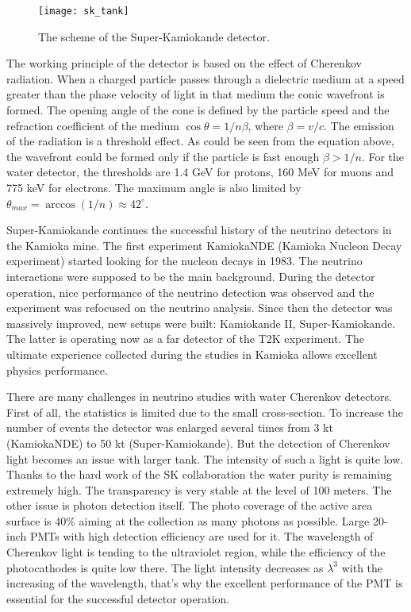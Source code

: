 \documentclass[../main.tex]{subfiles}
\begin{document}
\begin{figure}[!ht]
  \centering
  \texttt{[image: sk\_tank]}
  \caption{The scheme of the Super-Kamiokande detector.}
  \label{fig:t2k:sk}
\end{figure}

The working principle of the detector is based on the effect of Cherenkov radiation. When a charged particle passes through a dielectric medium at a speed greater than the phase velocity of light in that medium the conic wavefront is formed. The opening angle of the cone is defined by the particle speed and the refraction coefficient of the medium $\cos{\theta}=1/n\beta$, where $\beta=v/c$. The emission of the radiation is a threshold effect. As could be seen from the equation above, the wavefront could be formed only if the particle is fast enough $\beta>1/n$. For the water detector, the thresholds are 1.4 GeV for protons, 160 MeV for muons and 775 keV for electrons. The maximum angle is also limited by $\theta_{max}=\arccos(1/n)\approx42^\circ$.

Super-Kamiokande continues the successful history of the neutrino detectors in the Kamioka mine. The first experiment KamiokaNDE (Kamioka Nucleon Decay experiment) started looking for the nucleon decays in 1983. The neutrino interactions were supposed to be the main background. During the detector operation, nice performance of the neutrino detection was observed and the experiment was refocused on the neutrino analysis. Since then the detector was massively improved, new setups were built: Kamiokande II, Super-Kamiokande. The latter is operating now as a far detector of the T2K experiment. The ultimate experience collected during the studies in Kamioka allows excellent physics performance.

There are many challenges in neutrino studies with water Cherenkov detectors. First of all, the statistics is limited due to the small cross-section. To increase the number of events the detector was enlarged several times from 3 kt (KamiokaNDE) to 50 kt (Super-Kamiokande). But the detection of Cherenkov light becomes an issue with larger tank. The intensity of such a light is quite low. Thanks to the hard work of the SK collaboration the water purity is remaining extremely high. The transparency is very stable at the level of 100 meters. The other issue is photon detection itself. The photo coverage of the active area surface is 40\% aiming at the collection as many photons as possible. Large 20-inch PMTs with high detection efficiency are used for it. The wavelength of Cherenkov light is tending to the ultraviolet region, while the efficiency of the photocathodes is quite low there. The light intensity decreases as $\lambda^3$ with the increasing of the wavelength, that's why the excellent performance of the PMT is essential for the successful detector operation.
\end{document}
